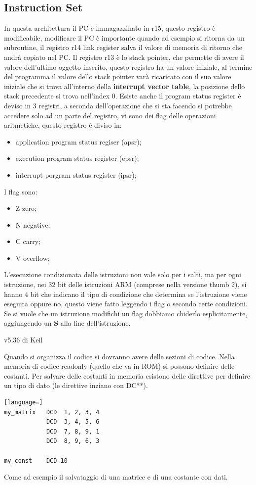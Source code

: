 \documentclass[12pt]{article}
\begin{document}
\subsection{Instruction Set}
In questa architettura il PC \`e immagazzinato in r15, questo registro \`e modificabile, modificare il PC \`e importante quando ad esempio si ritorna da un subroutine, il registro r14 link register salva il valore di memoria di ritorno che andr\`a copiato nel PC. Il registro r13 \`e lo stack pointer, che permette di avere il valore dell'ultimo oggetto inserito, questo registro ha un valore iniziale, al termine del programma il valore dello stack pointer var\`a ricaricato con il suo valore iniziale che si trova all'interno della \textbf{interrupt vector table}, la posizione dello stack precedente si trova nell'index 0. Esiste anche il program status register \`e deviso in 3 registri, a seconda dell'operazione che si sta facendo si potrebbe accedere solo ad un parte del registro, vi sono dei flag delle operazioni aritmetiche, questo registro \`e diviso in:
\begin{itemize}
    \item application program status regiser (apsr);
    \item execution program status register (epsr);
    \item interrupt porgram status register (ipsr);
\end{itemize}

I flag sono:
\begin{itemize}
    \item Z zero;
    \item N negative;
    \item C carry;
    \item V overflow;
\end{itemize}

L'esecuzione condizionata delle istruzioni non vale solo per i salti, ma per ogni istruzione, nei 32 bit delle istruzioni ARM (comprese nella versione thumb 2), si hanno 4 bit che indicano il tipo di condizione che determina se l'istruzione viene eseguita oppure no, questo viene fatto leggendo i flag o secondo certe condizioni. Se si vuole che un istruzione modifichi un flag dobbiamo chiderlo esplicitamente, aggiungendo un \textbf{S} alla fine dell'istruzione.


v5.36 di Keil



Quando si organizza il codice si dovranno avere delle sezioni di codice. Nella memoria di codice readonly (quello che va in ROM) si possono definire delle costanti. Per salvare delle costanti in memoria esistono delle direttive per definire un tipo di dato (le direttive inziano con DC**).
\begin{lstlisting}[language=]
my_matrix   DCD  1, 2, 3, 4
            DCD  3, 4, 5, 6
            DCD  7, 8, 9, 1
            DCD  8, 9, 6, 3

my_const    DCD 10
\end{lstlisting}
Come ad esempio il salvataggio di una matrice e di una costante con dati.
\end{document}
